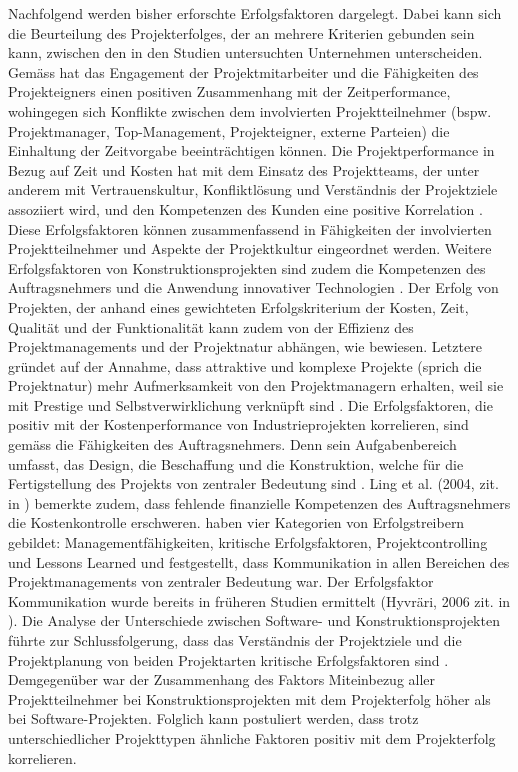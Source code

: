 Nachfolgend werden bisher erforschte Erfolgsfaktoren dargelegt. Dabei kann sich die Beurteilung des Projekterfolges, der an mehrere Kriterien gebunden sein kann, zwischen den in den Studien untersuchten Unternehmen unterscheiden. Gemäss \citet{iyerjha06} hat das Engagement der Projektmitarbeiter und die Fähigkeiten des Projekteigners einen positiven Zusammenhang mit der Zeitperformance, wohingegen sich Konflikte zwischen dem involvierten Projektteilnehmer (bspw. Projektmanager, Top-Management, Projekteigner, externe Parteien) die Einhaltung der Zeitvorgabe beeinträchtigen können. Die Projektperformance in Bezug auf Zeit und Kosten hat mit dem Einsatz des Projektteams, der unter anderem mit Vertrauenskultur, Konfliktlösung und Verständnis der Projektziele assoziiert wird, und den Kompetenzen des Kunden eine positive Korrelation \citep*{chahota01}. Diese Erfolgsfaktoren können zusammenfassend in Fähigkeiten der involvierten Projektteilnehmer und Aspekte der Projektkultur eingeordnet werden. Weitere Erfolgsfaktoren von Konstruktionsprojekten sind zudem die Kompetenzen des Auftragsnehmers und die Anwendung innovativer Technologien \citep*{chahota01}. Der Erfolg von Projekten, der anhand eines gewichteten Erfolgskriterium der Kosten, Zeit, Qualität und der Funktionalität kann zudem von der Effizienz des Projektmanagements und der Projektnatur abhängen, wie \citet{lchch08} bewiesen. Letztere gründet auf der Annahme, dass attraktive und komplexe Projekte (sprich die Projektnatur) mehr Aufmerksamkeit von den Projektmanagern erhalten, weil sie mit Prestige und Selbstverwirklichung verknüpft sind \citep{lchch08}. Die Erfolgsfaktoren, die positiv mit der Kostenperformance von Industrieprojekten korrelieren, sind gemäss \citet{luhuazha17} die Fähigkeiten des Auftragsnehmers. Denn sein Aufgabenbereich umfasst, das Design, die Beschaffung und die Konstruktion, welche für die Fertigstellung des Projekts von zentraler Bedeutung sind \citep{luhuazha17}. Ling et al. (2004, zit. in \citealp*{luhuazha17}) bemerkte zudem, dass fehlende finanzielle Kompetenzen des Auftragsnehmers die Kostenkontrolle erschweren.
\newline \citet{BeDeNov2015} haben vier Kategorien von Erfolgstreibern gebildet: Managementfähigkeiten, kritische Erfolgsfaktoren, Projektcontrolling und \glqq Lessons Learned\grqq{} und festgestellt, dass Kommunikation in allen Bereichen des Projektmanagements von zentraler Bedeutung war. Der Erfolgsfaktor Kommunikation wurde bereits in früheren Studien ermittelt (Hyvräri, 2006 zit. in \citealp*{BeDeNov2015}). Die Analyse der Unterschiede zwischen Software- und Konstruktionsprojekten führte zur Schlussfolgerung, dass das Verständnis der Projektziele und die Projektplanung von beiden Projektarten kritische Erfolgsfaktoren sind \citep{VarDom14}. Demgegenüber war der Zusammenhang des Faktors \glqq Miteinbezug aller Projektteilnehmer\grqq{} bei Konstruktionsprojekten mit dem Projekterfolg höher als bei Software-Projekten. Folglich kann postuliert werden, dass trotz unterschiedlicher Projekttypen ähnliche Faktoren positiv mit dem Projekterfolg korrelieren.
